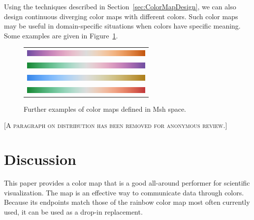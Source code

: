 \documentclass[review,journal]{vgtc}         %
\newcommand{\sticky}[1]{\textsc{[#1]}}
\newcommand{\Msh}{Msh\xspace}
\begin{document}
Using the techniques described in Section~\ref{sec:ColorMapDesign}, we can
also design continuous diverging color maps with different colors.  Such
color maps may be useful in domain-specific situations when colors have
specific meaning.  Some examples are given in
Figure~\ref{fig:OtherColorMaps}.

\begin{figure}
  \centering
  \begin{tabular}{c}
    \includegraphics[width=2.5in]{images/Purple2OrangeBar} \\
    \includegraphics[width=2.5in]{images/Green2PurpleBar} \\
    \includegraphics[width=2.5in]{images/Blue2TanBar} \\
    \includegraphics[width=2.5in]{images/Green2RedDivBar}
  \end{tabular}
  \caption{Further examples of color maps defined in \Msh space.}
  \label{fig:OtherColorMaps}
\end{figure}

\sticky{A paragraph on distribution has been removed for anonymous review.}


\section{Discussion}
\label{sec:Discussion}

This paper provides a color map that is a good all-around performer for
scientific visualization.  The map is an effective way to communicate data
through colors.  Because its endpoints match those of the rainbow
color map most often currently used, it can be used as a drop-in
replacement.
\end{document}

